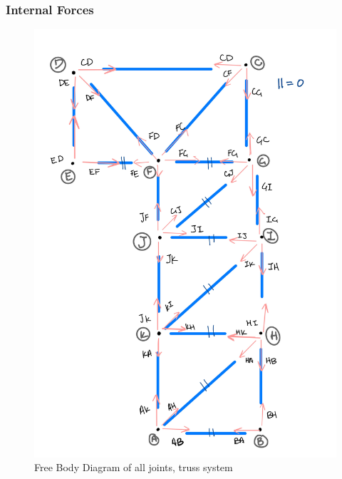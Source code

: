 \subsubsection{Internal Forces}
\begin{figure}
\centering
\includegraphics[width=\textwidth]{con2_fbd.jpg}
\caption{Free Body Diagram of all joints, truss system}
\end{figure}
 \centering
